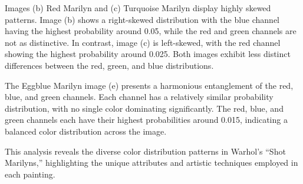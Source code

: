 \documentclass{article}
\begin{document}
Images (b) Red Marilyn and (c) Turquoise Marilyn display highly skewed
patterns. Image (b) shows a right-skewed distribution with the blue
channel having the highest probability around 0.05, while the red and
green channels are not as distinctive. In contrast, image (c) is
left-skewed, with the red channel showing the highest probability around
0.025. Both images exhibit less distinct differences between the red,
green, and blue distributions.

The Eggblue Marilyn image (e) presents a harmonious entanglement of the
red, blue, and green channels. Each channel has a relatively similar
probability distribution, with no single color dominating significantly.
The red, blue, and green channels each have their highest probabilities
around 0.015, indicating a balanced color distribution across the image.

This analysis reveals the diverse color distribution patterns in
Warhol's ``Shot Marilyns,'' highlighting the unique attributes and
artistic techniques employed in each painting.
\end{document}
